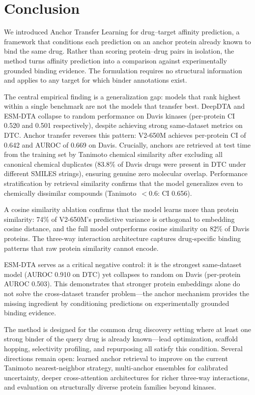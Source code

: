 \section{Conclusion}

We introduced Anchor Transfer Learning for drug--target affinity prediction, a framework that conditions each prediction on an anchor protein already known to bind the same drug. Rather than scoring protein--drug pairs in isolation, the method turns affinity prediction into a comparison against experimentally grounded binding evidence. The formulation requires no structural information and applies to any target for which binder annotations exist.

The central empirical finding is a generalization gap: models that rank highest within a single benchmark are not the models that transfer best. DeepDTA and ESM-DTA collapse to random performance on Davis kinases (per-protein CI 0.520 and 0.501 respectively), despite achieving strong same-dataset metrics on DTC. Anchor transfer reverses this pattern: V2-650M achieves per-protein CI of 0.642 and AUROC of 0.669 on Davis. Crucially, anchors are retrieved at test time from the training set by Tanimoto chemical similarity after excluding all canonical chemical duplicates (83.8\% of Davis drugs were present in DTC under different SMILES strings), ensuring genuine zero molecular overlap. Performance stratification by retrieval similarity confirms that the model generalizes even to chemically dissimilar compounds (Tanimoto~$< 0.6$: CI 0.656).

A cosine similarity ablation confirms that the model learns more than protein similarity: 74\% of V2-650M's predictive variance is orthogonal to embedding cosine distance, and the full model outperforms cosine similarity on 82\% of Davis proteins. The three-way interaction architecture captures drug-specific binding patterns that raw protein similarity cannot encode.

ESM-DTA serves as a critical negative control: it is the strongest same-dataset model (AUROC 0.910 on DTC) yet collapses to random on Davis (per-protein AUROC 0.503). This demonstrates that stronger protein embeddings alone do not solve the cross-dataset transfer problem---the anchor mechanism provides the missing ingredient by conditioning predictions on experimentally grounded binding evidence.

The method is designed for the common drug discovery setting where at least one strong binder of the query drug is already known---lead optimization, scaffold hopping, selectivity profiling, and repurposing all satisfy this condition. Several directions remain open: learned anchor retrieval to improve on the current Tanimoto nearest-neighbor strategy, multi-anchor ensembles for calibrated uncertainty, deeper cross-attention architectures for richer three-way interactions, and evaluation on structurally diverse protein families beyond kinases.

